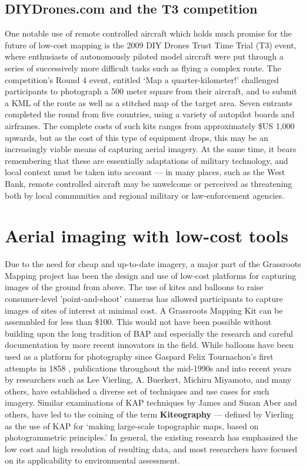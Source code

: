 \documentclass[11pt,oneside,notitlepage]{report}
\begin{document}
\subsection{DIYDrones.com and the T3 competition}

One notable use of remote controlled aircraft which holds much promise for the future of low-cost mapping is the 2009 DIY Drones Trust Time Trial (T3) event, where enthusiasts of autonomously piloted model aircraft were put through a series of successively more difficult tasks such as flying a complex route. The competition's Round 4 event, entitled `Map a quarter-kilometer!' challenged participants to photograph a 500 meter square from their aircraft, and to submit a KML of the route as well as a stitched map of the target area. Seven entrants completed the round from five countries, using a variety of autopilot boards and airframes. \cite{anderson2010winners} The complete costs of such kits ranges from approximately \$US 1,000 upwards, but as the cost of this type of equipment drops, this may be an increasingly viable means of capturing aerial imagery. At the same time, it bears remembering that these are essentially adaptations of military technology, and local context must be taken into account --- in many places, such as the West Bank, remote controlled aircraft may be unwelcome or perceived as threatening both by local communities and regional military or law-enforcement agencies. 

\section{Aerial imaging with low-cost tools}
\label{sec:aeriallowcost}

Due to the need for cheap and up-to-date imagery, a major part of the Grassroots Mapping project has been the design and use of low-cost platforms for capturing images of the ground from above. The use of kites and balloons to raise consumer-level 'point-and-shoot' cameras has allowed participants to capture images of sites of interest at minimal cost. A Grassroots Mapping Kit can be assemnbled for less than \$100. This would not have been possible without building upon the long tradition of \ac{BAP} and especially the research and careful documentation by more recent innovators in the field. While balloons have been used as a platform for photography since Gaspard Felix Tournachon's first attempts in 1858 \cite{vierling2006short}, publications throughout the mid-1990s and into recent years by researchers such as Lee Vierling, A. Buerkert, Michiru Miyamoto, and many others, have established a diverse set of techniques and use cases for such imagery. Similar examinations of \ac{KAP} techniques by James and Susan Aber and others, have led to the coining of the term \textbf{Kiteography} --- defined by Vierling as the use of \ac{KAP} for `making large-scale topographic maps, based on photogrammetric principles.' \cite{vierling2006short} In general, the existing research has emphasized the low cost and high resolution of resulting data, and most researchers have focused on its applicability to environmental assessment. \cite{aber1999kite}\cite{aber2002unmanned}\cite{miyamoto2004use}\cite{boike2003mapping}
\end{document}

